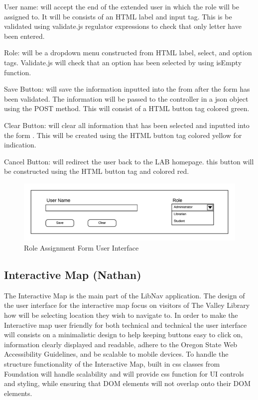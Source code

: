 \documentclass[letterpaper,10pt,titlepage, onecolumn, compsoc]{IEEEtran}
\begin{document}
User name: will accept the end of the extended user in which the role will be assigned to.  It will be consists of an HTML label and input tag. This is be validated using validate.js regulator expressions to check that only letter have been entered.

Role: will be a dropdown menu constructed from HTML label, select, and option tags. Validate.js will check that an option has been selected by using isEmpty function.  

Save Button: will save the information inputted into the from after the form has been validated. The information will be passed to the controller in a json object using the POST method. This will consist of a HTML button tag colored green. 

Clear Button: will clear all information that has been selected and inputted into the form . This will be created using the HTML button tag colored yellow for indication. 

Cancel Button: will redirect the user back to the LAB homepage. this button will be constructed using the HTML button tag and colored red.

\begin{figure}[h!]
\centering
\includegraphics[scale=.6]{images/role-assignment-form.png}
\caption{Role Assignment Form User Interface}
\label{fig:method}
\end{figure}

\subsection{Interactive Map (Nathan)}
The Interactive Map is the main part of the LibNav application. The design of the user interface for the interactive map focus on visitors of The Valley Library how will be selecting location they wish to navigate to. In order to make the Interactive map user friendly for both technical and technical the user interface will consists on a minimalistic design to help keeping buttons easy to click on, information clearly displayed and readable, adhere to the Oregon State Web Accessibility Guidelines, and be scalable to mobile devices. To handle the structure functionality of the Interactive Map, built in css classes from Foundation will handle scalability and will provide css function for UI controls and styling, while ensuring that DOM elements will not overlap onto their DOM elements. 
\end{document}
